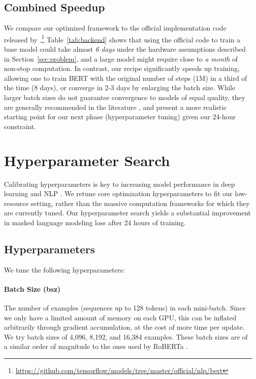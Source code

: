 \documentclass[11pt]{article}
\newcommand{\bertlarge}{BERT }
\begin{document}
%
 

\subsection{Combined Speedup}

We compare our optimized framework to the official implementation code released by \citet{devlin-etal-2019-bert}.\footnote{\url{https://github.com/tensorflow/models/tree/master/official/nlp/bert}}
Table~\ref{tab:backend} shows that using the official code to train a base model could take almost \textit{6 days} under the hardware assumptions described in Section~\ref{sec:problem}, and a large model might require close to \textit{a month} of non-stop computation.
In contrast, our recipe significantly speeds up training, allowing one to train \bertlarge with the original number of steps (1M) in a third of the time (8 days), or converge in 2-3 days by enlarging the batch size.
While larger batch sizes do not guarantee convergence to models of equal quality, they are generally recommended in the literature \cite{ott-etal-2018-scaling,Liu2019RoBERTaAR}, and present a more realistic starting point for our next phase (hyperparameter tuning) given our 24-hour constraint.



 \section{Hyperparameter Search}
\label{sec:hyperparameters}

Calibrating hyperparameters is key to increasing model performance in deep learning and NLP \cite{levy-etal-2015-improving, Liu2019RoBERTaAR}.
We retune core optimization hyperparameters to fit our low-resource setting, rather than the massive computation frameworks for which they are currently tuned.
Our hyperparameter search yields a substantial improvement in masked language modeling loss after 24 hours of training.


\subsection{Hyperparameters}

We tune the following hyperparameters:

\paragraph{Batch Size (bsz)}
The number of examples (sequences up to 128 tokens) in each mini-batch.
Since we only have a limited amount of memory on each GPU, this can be inflated arbitrarily through gradient accumulation, at the cost of more time per update.
We try batch sizes of 4,096, 8,192, and 16,384 examples.
These batch sizes are of a similar order of magnitude to the ones used by RoBERTa \cite{Liu2019RoBERTaAR}.
\end{document}
